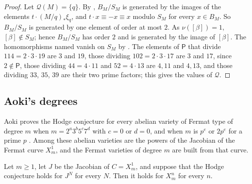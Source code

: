 \begin{proof}
Let $\mathcal Q(M)=\{q\}$. By , $B_{M}/S_{M}$ is generated by
the images of the elements $t\cdot(M/q)_{*}\xi_{q}$, and $t\cdot x\equiv-x
\equiv x$ modulo $S_{M}$ for every $x\in B_{M}$. So $B_{M}/S_{M}$ is
generated by one element of order at most $2$. As $\nu([\beta])=1$,
$[\beta]\notin S_{M}$; hence $B_{M}/S_{M}$ has order $2$ and is generated by
the image of $[\beta]$. The homomorphisms named vanish on $S_{M}$ by
. The elements of $\mathsf P$ that divide
$114=2\cdot3\cdot19$ are $3$ and $19$, those dividing $102=2\cdot3\cdot17$
are $3$ and $17$, since $2\notin\mathsf P$, those dividing $44=4\cdot11$ and
$52=4\cdot13$ are $4,11$ and $4,13$, and those dividing $33$, $35$, $39$ are
their two prime factors; this gives the values of $\mathcal Q$.
\end{proof}

\subsection{Aoki's degrees}
Aoki proves the Hodge conjecture for every abelian variety of Fermat type of
degree $m$ when $m=2^{a}3^{b}5^{c}7^{d}$ with $c=0$ or $d=0$, and when $m$ is
$p^{e}$ or $2p^{e}$ for a prime $p$ \cite[Theorem~0.1]{Aok00}. Among these
abelian varieties are the powers of the Jacobian of the Fermat curve
$X^{1}_{m}$, and the Fermat varieties of degree $m$ are built from that
curve.

\begin{lemma}\label{lem:abelianfermat}
Let $m\ge1$, let $J$ be the Jacobian of $C=X^{1}_{m}$, and suppose that the
Hodge conjecture holds for $J^{N}$ for every $N$. Then it holds for
$X^{n}_{m}$ for every $n$.
\end{lemma}

